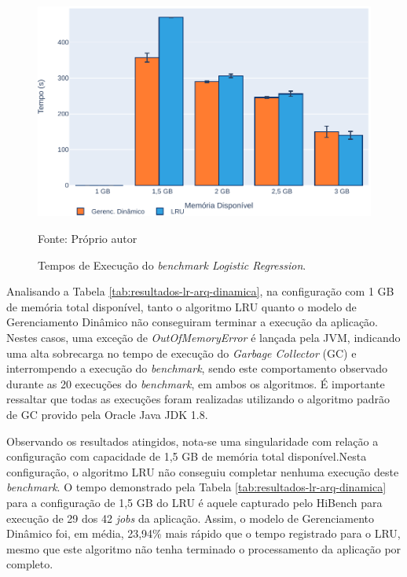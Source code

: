 \begin{figure}[!ht]
    \caption{Tempos de Execução do \textit{benchmark Logistic Regression}.}
    \begin{center}
        \includegraphics[scale=1.0]{imagens/Gerenc-Logistic-Regression.pdf}
    \end{center}
    \small{Fonte: Próprio autor}
    \label{fig:arq-dinamica-lr}
\end{figure}

Analisando a Tabela \ref{tab:resultados-lr-arq-dinamica}, na configuração com 1 GB de memória total disponível, tanto o algoritmo LRU quanto o modelo de Gerenciamento Dinâmico não conseguiram terminar a execução da aplicação. Nestes casos, uma exceção de \textit{OutOfMemoryError} é lançada pela JVM, indicando uma alta sobrecarga no tempo de execução do \textit{Garbage Collector} (GC) e interrompendo a execução do \textit{benchmark}, sendo este comportamento observado durante as 20 execuções do \textit{benchmark}, em ambos os algoritmos. É importante ressaltar que todas as execuções foram realizadas utilizando o algoritmo padrão de GC provido pela Oracle Java JDK 1.8.

Observando os resultados atingidos, nota-se uma singularidade com relação a configuração com capacidade de 1,5 GB de memória total disponível.Nesta configuração, o algoritmo LRU não conseguiu completar nenhuma execução deste \textit{benchmark}. O tempo demonstrado pela Tabela \ref{tab:resultados-lr-arq-dinamica} para a configuração de 1,5 GB do LRU é aquele capturado pelo HiBench para execução de 29 dos 42 \textit{jobs} da aplicação. Assim, o modelo de Gerenciamento Dinâmico foi, em média, 23,94\% mais rápido que o tempo registrado para o LRU, mesmo que este algoritmo não tenha terminado o processamento da aplicação por completo. 

